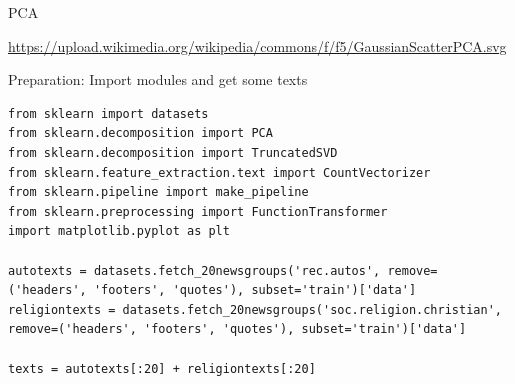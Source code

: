 \documentclass[compress]{beamer}
\begin{document}
\begin{frame}{PCA}

\tiny{\url{https://upload.wikimedia.org/wikipedia/commons/f/f5/GaussianScatterPCA.svg}}
\end{frame}



\begin{frame}{Preparation: Import modules and get some texts}
\begin{lstlisting}
from sklearn import datasets
from sklearn.decomposition import PCA
from sklearn.decomposition import TruncatedSVD
from sklearn.feature_extraction.text import CountVectorizer
from sklearn.pipeline import make_pipeline
from sklearn.preprocessing import FunctionTransformer
import matplotlib.pyplot as plt

autotexts = datasets.fetch_20newsgroups('rec.autos', remove=('headers', 'footers', 'quotes'), subset='train')['data']
religiontexts = datasets.fetch_20newsgroups('soc.religion.christian', remove=('headers', 'footers', 'quotes'), subset='train')['data']

texts = autotexts[:20] + religiontexts[:20]
\end{lstlisting}
\end{frame}
\end{document}
